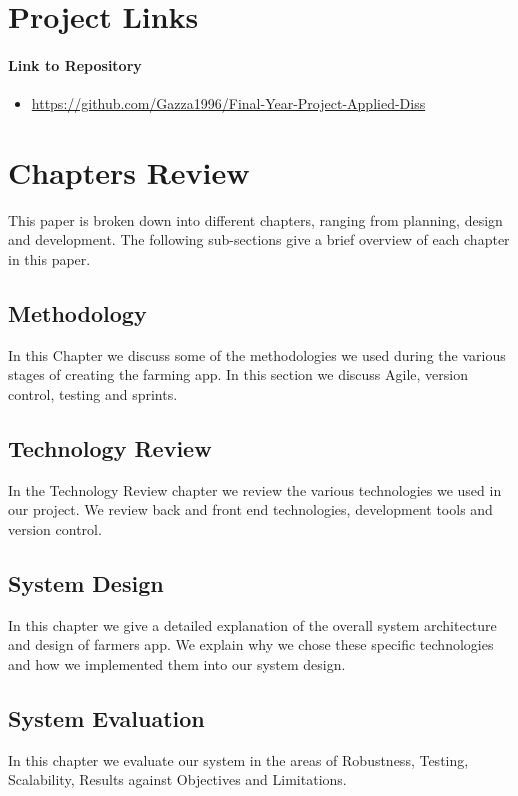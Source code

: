 \documentclass[12pt,a4paper,oneside,openany]{book}
\begin{document}
\section{Project Links}

\paragraph{Link to Repository}
\begin{itemize}
\item \href{https://github.com/Gazza1996/Final-Year-Project-Applied-Diss}{https://github.com/Gazza1996/Final-Year-Project-Applied-Diss} 
\end{itemize}

\section{Chapters Review}
This paper is broken down into different chapters, ranging from planning, design and development. The following sub-sections give a brief overview of each chapter in this paper.

\subsection{Methodology}
In this Chapter we discuss some of the methodologies we used during the various stages of creating the farming app. In this section we discuss Agile, version control, testing and sprints.

\subsection{Technology Review}
In the Technology Review chapter we review the various technologies we used in our project. We review back and front end technologies, development tools and version control.

\subsection{System Design}
In this chapter we give a detailed explanation of the overall system
architecture and design of farmers app. We explain why we chose these specific technologies and how we implemented them into our system design.


\subsection{System Evaluation}
In this chapter we evaluate our system in the areas of Robustness, Testing, Scalability, Results against Objectives and Limitations.
\end{document}
